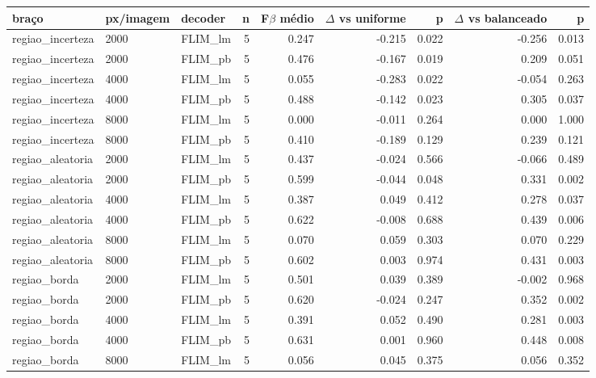 \begin{adjustbox}{max width=\linewidth}
\begin{tabular}{lllrrrrrr}
\toprule
braço & px/imagem & decoder & n & F$\beta$ médio & $\Delta$ vs uniforme & p & $\Delta$ vs balanceado & p  \\
\midrule
regiao\_incerteza & 2000 & FLIM\_lm & 5 & 0.247 & -0.215 & 0.022 & -0.256 & 0.013 \\
regiao\_incerteza & 2000 & FLIM\_pb & 5 & 0.476 & -0.167 & 0.019 & 0.209 & 0.051 \\
regiao\_incerteza & 4000 & FLIM\_lm & 5 & 0.055 & -0.283 & 0.022 & -0.054 & 0.263 \\
regiao\_incerteza & 4000 & FLIM\_pb & 5 & 0.488 & -0.142 & 0.023 & 0.305 & 0.037 \\
regiao\_incerteza & 8000 & FLIM\_lm & 5 & 0.000 & -0.011 & 0.264 & 0.000 & 1.000 \\
regiao\_incerteza & 8000 & FLIM\_pb & 5 & 0.410 & -0.189 & 0.129 & 0.239 & 0.121 \\
regiao\_aleatoria & 2000 & FLIM\_lm & 5 & 0.437 & -0.024 & 0.566 & -0.066 & 0.489 \\
regiao\_aleatoria & 2000 & FLIM\_pb & 5 & 0.599 & -0.044 & 0.048 & 0.331 & 0.002 \\
regiao\_aleatoria & 4000 & FLIM\_lm & 5 & 0.387 & 0.049 & 0.412 & 0.278 & 0.037 \\
regiao\_aleatoria & 4000 & FLIM\_pb & 5 & 0.622 & -0.008 & 0.688 & 0.439 & 0.006 \\
regiao\_aleatoria & 8000 & FLIM\_lm & 5 & 0.070 & 0.059 & 0.303 & 0.070 & 0.229 \\
regiao\_aleatoria & 8000 & FLIM\_pb & 5 & 0.602 & 0.003 & 0.974 & 0.431 & 0.003 \\
regiao\_borda & 2000 & FLIM\_lm & 5 & 0.501 & 0.039 & 0.389 & -0.002 & 0.968 \\
regiao\_borda & 2000 & FLIM\_pb & 5 & 0.620 & -0.024 & 0.247 & 0.352 & 0.002 \\
regiao\_borda & 4000 & FLIM\_lm & 5 & 0.391 & 0.052 & 0.490 & 0.281 & 0.003 \\
regiao\_borda & 4000 & FLIM\_pb & 5 & 0.631 & 0.001 & 0.960 & 0.448 & 0.008 \\
regiao\_borda & 8000 & FLIM\_lm & 5 & 0.056 & 0.045 & 0.375 & 0.056 & 0.352 \\

\end{tabular}
\end{adjustbox}
